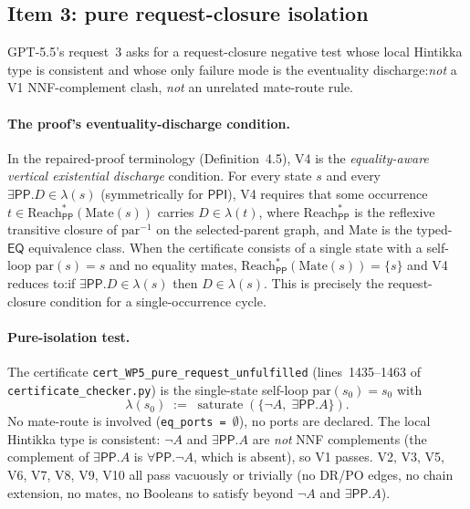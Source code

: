 \documentclass[11pt]{article}
\newcommand{\EQ}{\mathsf{EQ}}
\newcommand{\PP}{\mathsf{PP}}
\newcommand{\PPI}{\mathsf{PPI}}
\begin{document}
\subsection{Item 3: pure request-closure isolation}
\label{sec:requestclosure}

GPT-5.5's request~3 asks for a request-closure negative test whose
local Hintikka type is consistent and whose only failure mode is
the eventuality discharge:\@ \emph{not} a V1 NNF-complement clash,
\emph{not} an unrelated mate-route rule.

\paragraph{The proof's eventuality-discharge condition.}  In the
repaired-proof terminology (Definition~4.5), V4 is the
\emph{equality-aware vertical existential discharge} condition.
For every state \(s\) and every \(\exists\PP.D \in \lambda(s)\)
(symmetrically for \(\PPI\)), V4 requires that some occurrence
\(t \in \mathrm{Reach}_\PP^*(\mathrm{Mate}(s))\) carries
\(D \in \lambda(t)\), where \(\mathrm{Reach}_\PP^*\) is the
reflexive transitive closure of \(\mathrm{par}^{-1}\) on the
selected-parent graph, and \(\mathrm{Mate}\) is the typed-\(\EQ\)
equivalence class.  When the certificate consists of a single
state with a self-loop \(\mathrm{par}(s) = s\) and no equality
mates, \(\mathrm{Reach}_\PP^*(\mathrm{Mate}(s)) = \{s\}\) and V4
reduces to:\@ if \(\exists\PP.D \in \lambda(s)\) then
\(D \in \lambda(s)\).  This is precisely the request-closure
condition for a single-occurrence cycle.

\paragraph{Pure-isolation test.}  The certificate
\texttt{cert\_WP5\_pure\_request\_unfulfilled} (lines~1435--1463
of \texttt{certificate\_checker.py}) is the single-state self-loop
\(\mathrm{par}(s_0) = s_0\) with
\[
  \lambda(s_0) \;:=\; \operatorname{saturate}(\{\neg A,\; \exists\PP.A\}).
\]
No mate-route is involved (\texttt{eq\_ports = $\emptyset$}),
no ports are declared.  The local Hintikka type is consistent:\@
\(\neg A\) and \(\exists\PP.A\) are \emph{not} NNF complements
(the complement of \(\exists\PP.A\) is \(\forall\PP.\neg A\),
which is absent), so V1 passes.  V2, V3, V5, V6, V7, V8, V9, V10
all pass vacuously or trivially (no DR/PO edges, no chain
extension, no mates, no Booleans to satisfy beyond \(\neg A\) and
\(\exists\PP.A\)).
\end{document}
